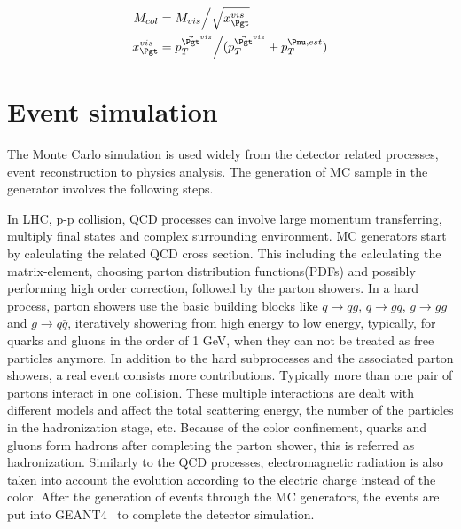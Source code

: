 \begin{align*}
\mcol&=M_{vis}\Big/\sqrt{x^{vis}_{\Pgt}}\\
x^{vis}_{\Pgt}&=p_{T}^{\vec{\Pgt}^{vis}}\Big/(p_{T}^{\vec{\Pgt}^{vis}}+p_{T}^{\Pnu,est})
\end{align*}

\section{Event simulation}
The Monte Carlo simulation is used widely from the detector related processes, event reconstruction to physics analysis. The generation of MC sample in the generator involves the following steps. 

In LHC, p-p collision, QCD processes can involve large momentum transferring, multiply final states and complex surrounding environment. MC generators start by calculating the related QCD cross section. This including the calculating the matrix-element, choosing parton distribution functions(PDFs) and possibly performing high order correction, followed by the parton showers. In a hard process, parton showers use the basic building blocks like $q\rightarrow qg$, $q\rightarrow gq$, $g\rightarrow gg$ and $g\rightarrow q\bar{q}$, iteratively showering from high energy to low energy, typically, for quarks and gluons in the order of 1 GeV, when they can not be treated as free particles anymore. In addition to the hard subprocesses and the associated parton showers, a real event consists more contributions. Typically more than one pair of partons interact in one collision. These multiple interactions are dealt with different models and affect the total scattering energy, the number of the particles in the hadronization stage, etc. Because of the color confinement, quarks and gluons form hadrons after completing the parton shower, this is referred as hadronization. Similarly to the QCD processes, electromagnetic radiation is also taken into account the evolution according to the electric charge instead of the color. After the generation of events through the MC generators, the events are put into GEANT4~\cite{GEANT4} to complete the detector simulation.


